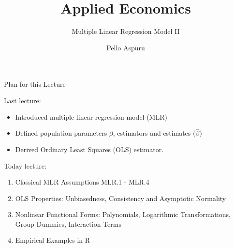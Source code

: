\documentclass[11pt, aspectratio = 169]{beamer}
\title{Applied Economics}
\subtitle{Multiple Linear Regression Model II}
\author{Pello Aspuru}
\date{}
\institute{Winter 2025/26}
\begin{document}
%

\maketitle

\begin{frame}{Plan for this Lecture}

Last lecture:
\begin{itemize}
    \item Introduced multiple linear regression model (MLR)
    \item Defined population parameters $\beta$, estimators and estimates ($\hat{\beta}$)
    \item Derived Ordinary Least Squares (OLS) estimator.
\end{itemize}    
\pause
Today lecture:
\begin{enumerate}
    \item Classical MLR Assumptions MLR.1 - MLR.4
    \item OLS Properties: Unbiasedness, Consistency and Asymptotic Normality
    \item Nonlinear Functional Forms: Polynomials, Logarithmic Transformations, Group Dummies, Interaction Terms
    \item Empirical Examples in R
\end{enumerate}
\end{frame}

\end{document}
